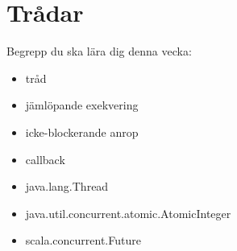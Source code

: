 \chapter{Trådar}\label{chapter:W12}
Begrepp du ska lära dig denna vecka:
\begin{multicols}{2}\begin{itemize}[nosep,label={$\square$},leftmargin=*]
\item tråd
\item jämlöpande exekvering
\item icke-blockerande anrop
\item callback
\item java.lang.Thread
\item java.util.concurrent.atomic.AtomicInteger
\item scala.concurrent.Future\end{itemize}\end{multicols}
